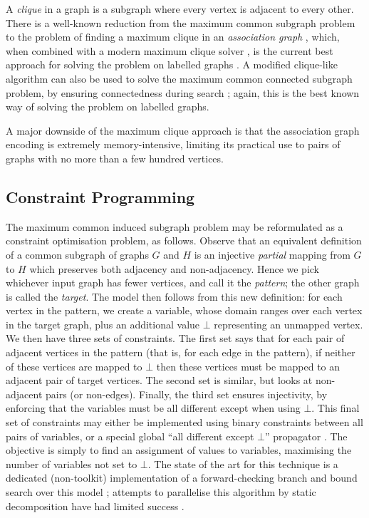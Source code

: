 \documentclass[sigconf]{acmart}
\begin{document}
A \emph{clique} in a graph is a subgraph where every vertex is adjacent to every other. There is a
well-known reduction from the maximum common subgraph problem to the problem of finding a maximum
clique in an \emph{association graph}
\citep{o:Levi73,DBLP:journals/jcamd/RaymondW02a,DBLP:conf/cp/McCreeshNPS16}, which, when combined with
a modern maximum clique solver \citep{DBLP:journals/ol/SegundoMRH13}, is the current best approach for
solving the problem on labelled graphs \citep{DBLP:conf/cp/McCreeshNPS16}. A modified clique-like
algorithm can also be used to solve the maximum common connected subgraph problem, by ensuring
connectedness during search \citep{DBLP:conf/cp/McCreeshNPS16}; again, this is the best known way of
solving the problem on labelled graphs.

A major downside of the maximum clique approach is that the association graph encoding is extremely
memory-intensive, limiting its practical use to pairs of graphs with no more than a few hundred
vertices.

\subsection{Constraint Programming}

The maximum common induced subgraph problem may be reformulated as a constraint optimisation
problem, as follows.  Observe that an equivalent definition of a common subgraph of graphs $G$ and
$H$ is an injective \emph{partial} mapping from $G$ to $H$ which preserves both adjacency and
non-adjacency.  Hence we pick whichever input graph has fewer vertices, and call it the
\emph{pattern}; the other graph is called the \emph{target}. The model then follows from this new
definition: for each vertex in the pattern, we create a variable, whose domain ranges over each
vertex in the target graph, plus an additional value $\bot$ representing an unmapped vertex. We then
have three sets of constraints.  The first set says that for each pair of adjacent vertices in the
pattern (that is, for each edge in the pattern), if neither of these vertices are mapped to $\bot$
then these vertices must be mapped to an adjacent pair of target vertices. The second set is
similar, but looks at non-adjacent pairs (or non-edges).  Finally, the third set ensures
injectivity, by enforcing that the variables must be all different except when using $\bot$. This
final set of constraints may either be implemented using binary constraints between all pairs of
variables, or a special global ``all different except $\bot$'' propagator
\citep{DBLP:conf/cp/PetitRB01}. The objective is simply to find an assignment of values to
variables, maximising the number of variables not set to $\bot$. The state of the art for this
technique is a dedicated (non-toolkit) implementation of a forward-checking branch and bound search
over this model \citep{DBLP:conf/cp/NdiayeS11,DBLP:conf/cp/McCreeshNPS16}; attempts to parallelise
this algorithm by static decomposition have had limited success \citep{DBLP:conf/ictai/MinotNS15}.
\end{document}
